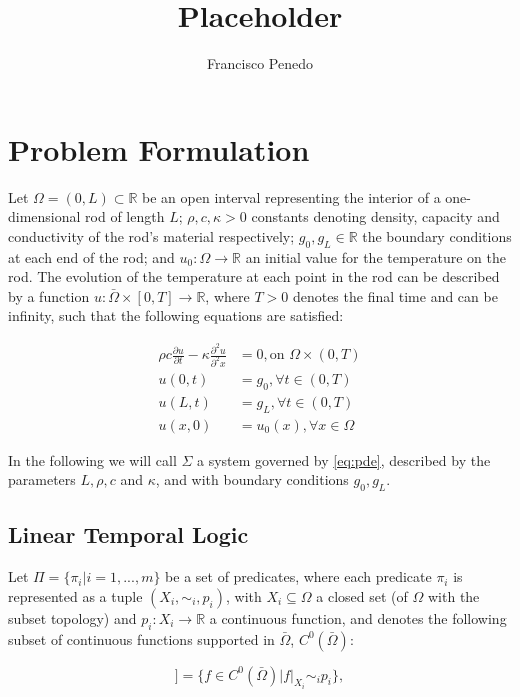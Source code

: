 \documentclass{article}
\title{Placeholder}
\author{Francisco Penedo}
\newcommand*{\R}{\mathbb{R}}
\newcommand*{\psat}[1]{[[#1]]}
\begin{document}
\section{Problem Formulation}
\label{sec:problem_formulation}

Let $\Omega = (0, L) \subset \R$ be an open interval representing the interior
of a one-dimensional rod of length $L$; $\rho, c, \kappa > 0$ 
constants denoting density, capacity and conductivity of the rod's material respectively;
$g_0, g_L \in \R$ the boundary conditions at each end of the rod; and $u_0 :
\Omega \rightarrow \R$ an initial value for the temperature on the rod. 
The evolution of the temperature at
each point in the rod can be described by a function $u : \bar \Omega \times [0,
T] \rightarrow \R$, where $T > 0$ denotes the final time and can be infinity, 
such that the following equations are satisfied:

\begin{equation}\label{eq:pde}
    \begin{aligned}
        \rho c \frac{\partial u}{\partial t} - \kappa \frac{\partial^2
        u}{\partial^2 x} &= 0, \text{on } \Omega \times (0, T) \\
        u(0, t) &= g_0, \forall t \in (0, T) \\
        u(L, t) &= g_L, \forall t \in (0, T) \\
        u(x, 0) &= u_0(x), \forall x \in \Omega
    \end{aligned}
\end{equation}

In the following we will call $\Sigma$ a system governed by \eqref{eq:pde},
described by the parameters $L, \rho, c$ and $\kappa$, and with boundary
conditions $g_0, g_L$.

\iffalse

\subsection{Linear Temporal Logic}
\label{sub:linear_temporal_logic}

Let $\Pi = \{\pi_i | i = 1, ..., m\}$ be a set of predicates, where each
predicate $\pi_i$ is represented as a tuple $(X_i, \sim_i, p_i)$, with $X_i \subseteq
\Omega$ a closed set (of $\Omega$ with the subset topology) and $p_i : X_i
\rightarrow \R$ a continuous function, and denotes the following subset of
continuous functions supported in $\bar\Omega$, $C^0(\bar\Omega)$:

\begin{equation}
    \psat{\pi_i} = \{ f \in C^0(\bar\Omega) | \left.f\right|_{X_i} \sim_i p_i \},
\end{equation}
\end{document}
